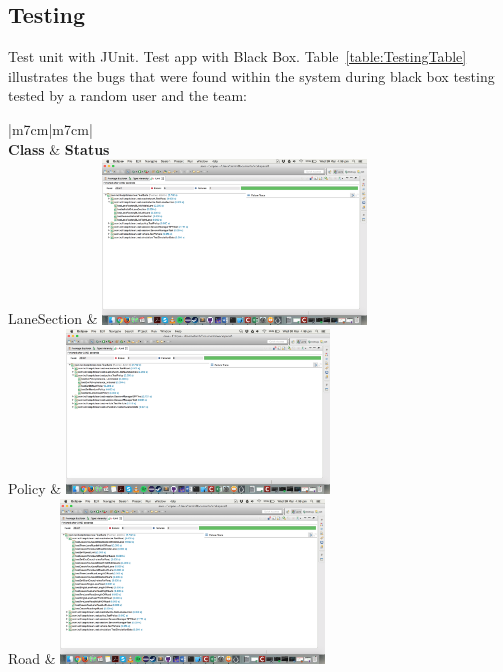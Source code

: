 \documentclass[11pt]{article}
\begin{document}
\subsection{Testing} 
Test unit with JUnit. Test app with Black Box. 
Table~\ref{table:TestingTable} illustrates the bugs that were found within the system during black box testing tested by a random user and the team:
\begin{center}
	\begin{table}[H]
	\begin{tabular}{|m{7cm}|m{7cm}|}
		 \hline
		 \\ \hline 
		 \centering \textbf{Class} & \textbf{Status}\\\hline
		 LaneSection & 
		 \includegraphics[width=7cm]{TestLaneSection}\\ \hline
		 Policy & \includegraphics[width=7cm]{TestPolicy}\\ \hline
		 Road & \includegraphics[width=7cm]{TestRoad}\\ \hline

\end{tabular}
\end{table}
\end{center}
\end{document}
